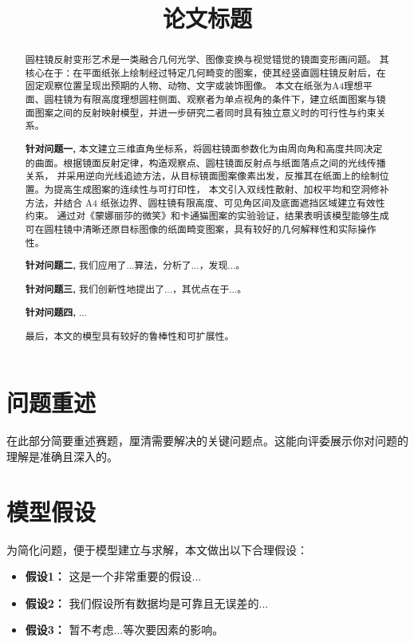 \documentclass[withoutpreface,notoc]{cumcmthesis}
\title{论文标题} %
\begin{document}
	\maketitle
	\begin{abstract}
		圆柱镜反射变形艺术是一类融合几何光学、图像变换与视觉错觉的镜面变形画问题。
		其核心在于：在平面纸张上绘制经过特定几何畸变的图案，使其经竖直圆柱镜反射后，在固定观察位置呈现出预期的人物、动物、文字或装饰图像。
		本文在纸张为A4理想平面、圆柱镜为有限高度理想圆柱侧面、观察者为单点视角的条件下，建立纸面图案与镜面图案之间的反射映射模型，并进一步研究二者同时具有独立意义时的可行性与约束关系。
		
		\textbf{针对问题一,} 本文建立三维直角坐标系，将圆柱镜面参数化为由周向角和高度共同决定的曲面。根据镜面反射定律，构造观察点、圆柱镜面反射点与纸面落点之间的光线传播关系，
		并采用逆向光线追迹方法，从目标镜面图案像素出发，反推其在纸面上的绘制位置。为提高生成图案的连续性与可打印性，
		本文引入双线性散射、加权平均和空洞修补方法，并结合 A4 纸张边界、圆柱镜有限高度、可见角区间及底面遮挡区域建立有效性约束。
		通过对《蒙娜丽莎的微笑》和卡通猫图案的实验验证，结果表明该模型能够生成可在圆柱镜中清晰还原目标图像的纸面畸变图案，具有较好的几何解释性和实际操作性。
		
		\textbf{针对问题二,} 我们应用了...算法，分析了...，发现...。
		
		\textbf{针对问题三,} 我们创新性地提出了...，其优点在于...。
		
		\textbf{针对问题四,} ...
		
		最后，本文的模型具有较好的鲁棒性和可扩展性。
		
	\end{abstract}
	
	
	\section{问题重述}
	在此部分简要重述赛题，厘清需要解决的关键问题点。这能向评委展示你对问题的理解是准确且深入的。
	
	\section{模型假设}
	为简化问题，便于模型建立与求解，本文做出以下合理假设：
	\begin{itemize}[itemindent=2em]
		\item \textbf{假设1：} 这是一个非常重要的假设...
		\item \textbf{假设2：} 我们假设所有数据均是可靠且无误差的...
		\item \textbf{假设3：} 暂不考虑...等次要因素的影响。
	\end{itemize}
	
\end{document}
